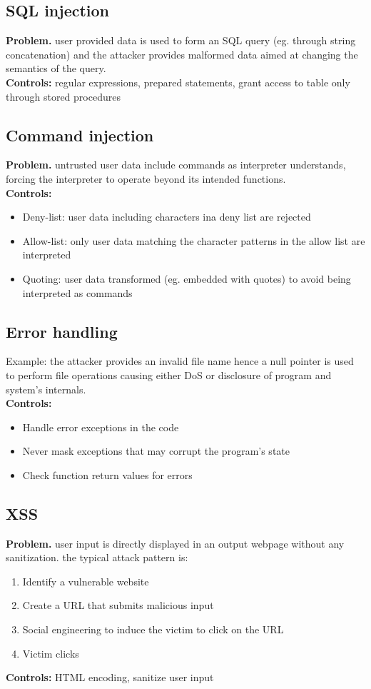 \documentclass[10pt,a4paper]{article}
\begin{document}
\subsection{SQL injection}
\textbf{Problem.} user provided data is used to form an SQL query (eg. through string concatenation) and the attacker provides malformed data aimed at changing the semantics of the query.\\
\textbf{Controls:} regular expressions, prepared statements, grant access to table only through stored procedures
\subsection{Command injection}
\textbf{Problem.} untrusted user data include commands as interpreter understands, forcing the interpreter to operate beyond its intended functions.\\
\textbf{Controls:}
\begin{itemize}
\item Deny-list: user data including characters ina deny list are rejected
\item Allow-list: only user data matching the character patterns in the allow list are interpreted
\item Quoting: user data transformed (eg. embedded with quotes) to avoid being interpreted as commands
\end{itemize}
\subsection{Error handling}
Example: the attacker provides an invalid file name hence a null pointer is used to perform file operations causing either DoS or disclosure of program and system's internals.\\
\textbf{Controls:}
\begin{itemize}
\item Handle error exceptions in the code
\item Never mask exceptions that may corrupt the program's state
\item Check function return values for errors
\end{itemize}
\subsection{XSS}
\textbf{Problem.} user input is directly displayed in an output webpage without any sanitization. the typical attack pattern is:
\begin{enumerate}
\item Identify a vulnerable website
\item Create a URL that submits malicious input
\item Social engineering to induce the victim to click on the URL
\item Victim clicks
\end{enumerate}
\textbf{Controls:} HTML encoding, sanitize user input
\end{document}

